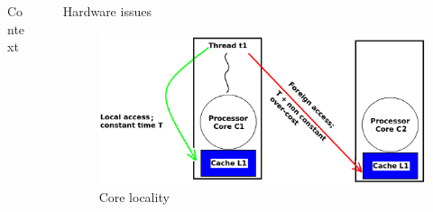 \documentclass[final]{beamer}
\newlength{\sepwid}
\newlength{\onecolwid}
\newlength{\twocolwid}
\begin{document}
\begin{frame}[t]
\begin{columns}[t]
\begin{column}{\onecolwid}
\begin{block}{Context}


\end{block}


\end{column} %

\begin{column}{\sepwid}\end{column}			%
\begin{column}{\twocolwid}					%
\begin{columns}[t,totalwidth=\twocolwid]	%
\begin{column}{\onecolwid}\vspace{-.6in}	%


\begin{block}{Hardware issues}

\begin{figure}
\includegraphics[width=1.0\linewidth]{charts/locality.png}
\caption{Core locality}
\end{figure}


\end{block}
\end{column}
\end{columns}
\end{column}
\end{columns}
\end{frame}
\end{document}
